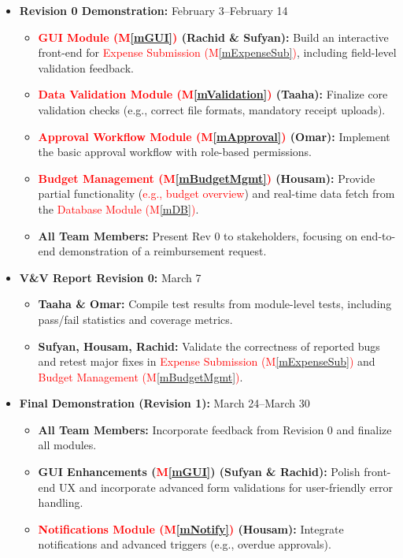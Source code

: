 \documentclass[12pt, titlepage]{article}
\newcommand{\mref}[1]{M\ref{#1}}
\begin{document}
\begin{itemize}
  \item \textbf{Revision 0 Demonstration:} February 3--February 14
  \begin{itemize}
    \item \textbf{\textcolor{red}{GUI Module (\mref{mGUI})} (Rachid \& Sufyan):} Build an interactive front-end for \textcolor{red}{Expense Submission (\mref{mExpenseSub})}, including field-level validation feedback.
    \item \textbf{\textcolor{red}{Data Validation Module (\mref{mValidation})} (Taaha):} Finalize core validation checks (e.g., correct file formats, mandatory receipt uploads).
    \item \textbf{\textcolor{red}{Approval Workflow Module (\mref{mApproval})} (Omar):} Implement the basic approval workflow with role-based permissions.
    \item \textbf{\textcolor{red}{Budget Management (\mref{mBudgetMgmt})} (Housam):} Provide partial functionality (\textcolor{red}{e.g., budget overview}) and real-time data fetch from the \textcolor{red}{Database Module (\mref{mDB})}.
    \item \textbf{All Team Members:} Present Rev 0 to stakeholders, focusing on end-to-end demonstration of a reimbursement request.
  \end{itemize}

  \item \textbf{V\&V Report Revision 0:} March 7
  \begin{itemize}
    \item \textbf{Taaha \& Omar:} Compile test results from module-level tests, including pass/fail statistics and coverage metrics.
    \item \textbf{Sufyan, Housam, Rachid:} Validate the correctness of reported bugs and retest major fixes in \textcolor{red}{Expense Submission (\mref{mExpenseSub})} and \textcolor{red}{Budget Management (\mref{mBudgetMgmt})}.
  \end{itemize}

  \item \textbf{Final Demonstration (Revision 1):} March 24--March 30
  \begin{itemize}
    \item \textbf{All Team Members:} Incorporate feedback from Revision 0 and finalize all modules.
    \item \textbf{GUI Enhancements (\textcolor{red}{\mref{mGUI}}) (Sufyan \& Rachid):} Polish front-end UX and incorporate advanced form validations for user-friendly error handling.
    \item \textbf{\textcolor{red}{Notifications Module (\mref{mNotify})} (Housam):} Integrate notifications and advanced triggers (e.g., overdue approvals).
  \end{itemize}


\end{itemize}
\end{document}
